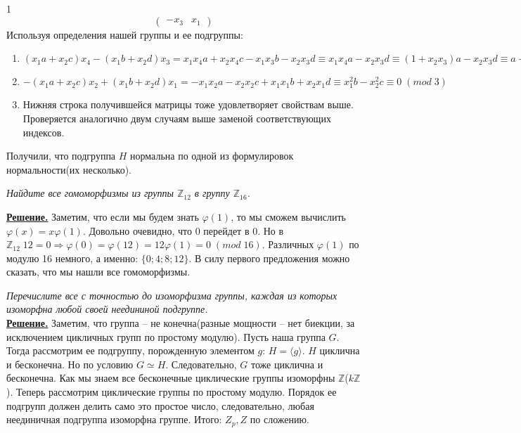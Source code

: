 \documentclass[14pt,a4paper]{scrartcl}
\begin{document}
\begin{spacing}{1}
$$\begin{pmatrix}
	-x_3 & x_1
	\end{pmatrix}
	$$
	Используя определения нашей группы и ее подгруппы:
	\begin{enumerate}
		\item $(x_1a+x_2c)x_4 - (x_1b+x_2d)x_3 = x_1x_4a + x_2x_4c - x_1x_3b-x_2x_3d \equiv x_1x_4a-x_2x_3d \equiv (1 + x_2x_3)a - x_2x_3d \equiv a + x_2x_3(a - d) \equiv a \equiv 1\;(mod\;3)$
		\item $-(x_1a+x_2c)x_2 + (x_1b+x_2d)x_1 = -x_1x_2a - x_2x_2c + x_1x_1b+x_2x_1d \equiv x_1^2b - x_2^2c \equiv 0\;(mod\;3)$
		\item Нижняя строка получившейся матрицы тоже удовлетворяет свойствам выше. Проверяется аналогично двум случаям выше заменой соответствующих индексов.
	\end{enumerate}
	Получили, что подгруппа $H$ нормальна по одной из формулировок нормальности(их несколько).
	
	
	\begin{center}
	\end{center}
	\textit{Найдите все гомоморфизмы из группы $\mathbb{Z}_{12}$ в группу $\mathbb{Z}_{16}$.}
	
	\noindent \textbf{\underline{Решение.}} Заметим, что если мы будем знать $\varphi(1)$, то мы сможем вычислить $\varphi(x) = x\varphi(1)$. Довольно очевидно, что 0 перейдет в 0. Но в $\mathbb{Z}_{12}\;12 = 0 \Rightarrow \varphi(0) = \varphi(12) = 12\varphi(1) = 0\;(mod\;16)$. Различных $\varphi(1)$ по модулю 16 немного, а именно: $\{0; 4; 8; 12\}$. В силу первого предложения можно сказать, что мы нашли все гомоморфизмы. 
	
	\begin{center}
	\end{center}
	\textit{Перечислите все с точностью до изоморфизма группы, каждая из которых изоморфна любой своей неедининой подгруппе.}\\
	\noindent \textbf{\underline{Решение.}} Заметим, что группа -- не конечна(разные мощности -- нет биекции, за исключением цикличных групп по простому модулю). Пусть наша группа $G$. Тогда рассмотрим ее подгруппу, порожденную элементом $g$: $H = \langle g \rangle$. $H$ циклична и бесконечна. Но по условию $G \simeq H$. Следовательно, $G$ тоже циклична и бесконечна. Как мы знаем все бесконечные циклические группы изоморфны $\mathbb{Z}$($k\mathbb{Z}$). Теперь рассмотрим циклические группы по простому модулю. Порядок ее подгрупп должен делить само это простое число, следовательно, любая неединичная подгруппа изоморфна группе. Итого: $Z_p, Z$ по сложению.
\end{spacing}
\end{document}
